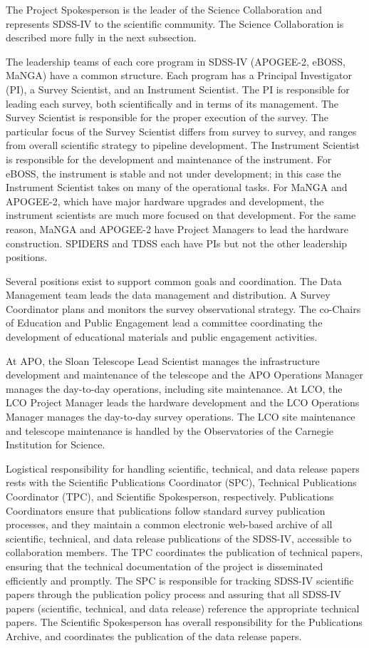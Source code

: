 The Project Spokesperson is the leader of the Science Collaboration
and represents SDSS-IV to the scientific community. The Science
Collaboration is described more fully in the next subsection.

The leadership teams of each core program in SDSS-IV (APOGEE-2, eBOSS,
MaNGA) have a common structure. Each program has a Principal
Investigator (PI), a Survey Scientist, and an Instrument Scientist.
The PI is responsible for leading each survey, both scientifically and
in terms of its management.  The Survey Scientist is responsible for
the proper execution of the survey. The particular focus of the Survey
Scientist differs from survey to survey, and ranges from overall
scientific strategy to pipeline development.  The Instrument Scientist
is responsible for the development and maintenance of the
instrument. For eBOSS, the instrument is stable and not under
development; in this case the Instrument Scientist takes on many of
the operational tasks. For MaNGA and APOGEE-2, which have major
hardware upgrades and development, the instrument scientists are much
more focused on that development.  For the same reason, MaNGA and
APOGEE-2 have Project Managers to lead the hardware construction.
SPIDERS and TDSS each have PIs but not the other leadership positions.

Several positions exist to support common goals and coordination.  The
Data Management team leads the data management and distribution.  A
Survey Coordinator plans and monitors the survey observational
strategy. The co-Chairs of Education and Public Engagement lead a
committee coordinating the development of educational materials and
public engagement activities.

At APO, the Sloan Telescope Lead Scientist manages the infrastructure
development and maintenance of the telescope and the APO Operations
Manager manages the day-to-day operations, including site
maintenance. At LCO, the LCO Project Manager leads the hardware
development and the LCO Operations Manager manages the day-to-day
survey operations. The LCO site maintenance and telescope maintenance
is handled by the Observatories of the Carnegie Institution for
Science.

Logistical responsibility for handling scientific, technical, and data
release papers rests with the Scientific Publications Coordinator
(SPC), Technical Publications Coordinator (TPC), and Scientific
Spokesperson, respectively. Publications Coordinators ensure
that publications follow standard survey publication processes, and they
maintain a common electronic web-based archive of all scientific,
technical, and data release publications of the SDSS-IV, accessible to
collaboration members.  The TPC coordinates the publication of technical
papers, ensuring that the technical documentation of the project is
disseminated efficiently and promptly.  The SPC is responsible for
tracking SDSS-IV scientific papers through the publication policy
process and assuring that all SDSS-IV papers (scientific, technical,
and data release) reference the appropriate technical papers. The
Scientific Spokesperson has overall responsibility for the
Publications Archive, and coordinates the publication of the data
release papers.

